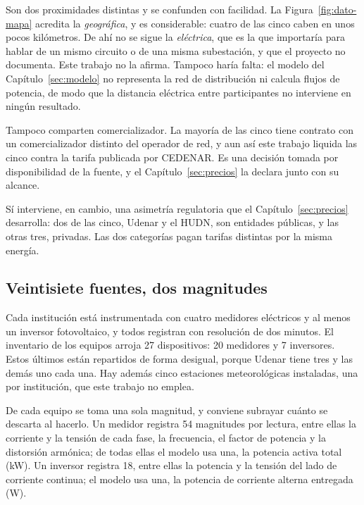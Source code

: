 \begin{guardado}
\begin{detallebox}
Son dos proximidades distintas y se confunden con facilidad. La
Figura~\ref{fig:dato-mapa} acredita la \emph{geográfica}, y es
considerable: cuatro de las cinco caben en unos pocos kilómetros. De ahí
no se sigue la \emph{eléctrica}, que es la que importaría para hablar de
un mismo circuito o de una misma subestación, y que el proyecto no
documenta. Este trabajo no la afirma. Tampoco haría falta: el modelo del
Capítulo~\ref{sec:modelo} no representa la red de distribución ni calcula
flujos de potencia, de modo que la distancia eléctrica entre participantes
no interviene en ningún resultado.

Tampoco comparten comercializador. La mayoría de las cinco tiene contrato
con un comercializador distinto del operador de red, y aun así este
trabajo liquida las cinco contra la tarifa publicada por CEDENAR. Es una
decisión tomada por disponibilidad de la fuente, y el
Capítulo~\ref{sec:precios} la declara junto con su alcance.
\end{detallebox}
\end{guardado}

Sí interviene, en cambio, una asimetría regulatoria que el
Capítulo~\ref{sec:precios} desarrolla: dos de las cinco, Udenar y el HUDN,
son entidades públicas, y las otras tres, privadas. Las dos categorías
pagan tarifas distintas por la misma energía.

\subsection{Veintisiete fuentes, dos magnitudes}
\label{sub:dato-fuentes}

Cada institución está instrumentada con cuatro medidores eléctricos y al
menos un inversor fotovoltaico, y todos registran con resolución
de dos minutos. El inventario de los equipos arroja
27 dispositivos: 20 medidores y 7 inversores. Estos últimos
están repartidos de forma desigual, porque Udenar tiene tres y las demás
uno cada una. Hay además cinco estaciones meteorológicas instaladas, una por
institución, que este trabajo no emplea.

De cada equipo se toma una sola magnitud, y conviene subrayar cuánto se
descarta al hacerlo. Un medidor registra 54
magnitudes por lectura, entre ellas la corriente y la tensión de cada fase,
la frecuencia, el factor de potencia y la distorsión armónica; de todas
ellas el modelo usa una, la potencia activa total (kW). Un inversor
registra 18, entre ellas la potencia y la tensión del lado de
corriente continua; el modelo usa una, la potencia de corriente alterna
entregada (W).

